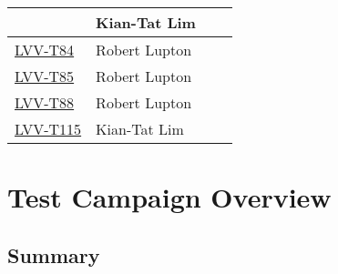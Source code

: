\documentclass[DM,lsstdraft,STR,toc]{lsstdoc}
\begin{document}
{\begin{longtable}{p{3cm}p{3cm}p{3cm}p{6cm}}
& {\small Kian-Tat Lim } & {\small  } &
\begin{minipage}[]{6cm}
\smallskip
{\small  }
\medskip
\end{minipage}
\\ \hline
\href{https://jira.lsstcorp.org/secure/Tests.jspa#/testCase/LVV-T84}{LVV-T84}
& {\small Robert Lupton } & {\small  } &
\begin{minipage}[]{6cm}
\smallskip
{\small  }
\medskip
\end{minipage}
\\ \hline
\href{https://jira.lsstcorp.org/secure/Tests.jspa#/testCase/LVV-T85}{LVV-T85}
& {\small Robert Lupton } & {\small  } &
\begin{minipage}[]{6cm}
\smallskip
{\small  }
\medskip
\end{minipage}
\\ \hline
\href{https://jira.lsstcorp.org/secure/Tests.jspa#/testCase/LVV-T88}{LVV-T88}
& {\small Robert Lupton } & {\small  } &
\begin{minipage}[]{6cm}
\smallskip
{\small  }
\medskip
\end{minipage}
\\ \hline
\href{https://jira.lsstcorp.org/secure/Tests.jspa#/testCase/LVV-T115}{LVV-T115}
& {\small Kian-Tat Lim } & {\small  } &
\begin{minipage}[]{6cm}
\smallskip
{\small  }
\medskip
\end{minipage}
\\ \hline
\end{longtable}
}

\newpage

\section{Test Campaign Overview}
\label{sect:overview}

\subsection{Summary}
\label{sect:summarytable}
\end{document}
